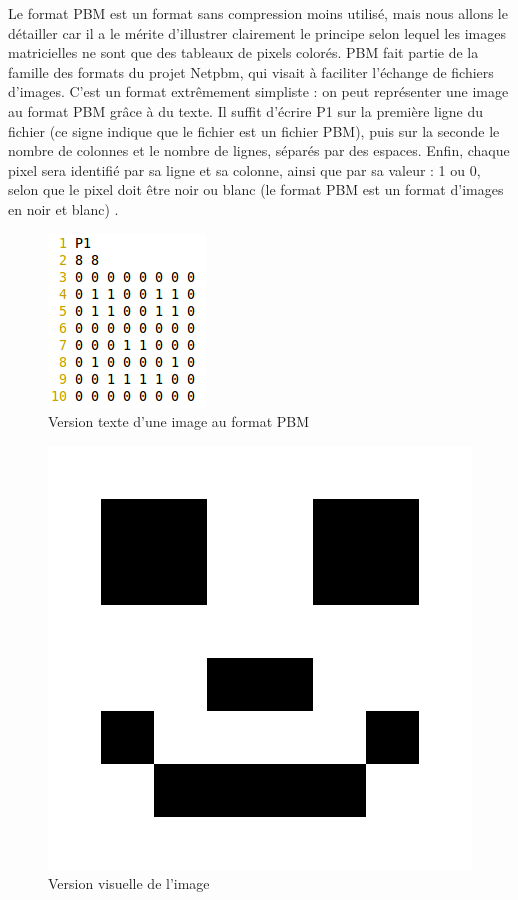 Le format PBM est un format sans compression moins utilisé, mais nous allons le détailler car il a le mérite d'illustrer clairement le
principe selon lequel les images matricielles ne sont que des tableaux
de pixels colorés. PBM fait partie de la famille des formats du projet Netpbm,
qui visait à faciliter l'échange de fichiers d'images. C'est un format
extrêmement simpliste : on peut représenter une image au format PBM grâce
à du texte. Il suffit d'écrire P1 sur la première ligne du fichier
(ce signe indique que le fichier est un fichier PBM), puis sur la
seconde le nombre de colonnes et le nombre de lignes, séparés par
des espaces. Enfin, chaque pixel sera identifié par sa ligne et sa
colonne, ainsi que par sa valeur : 1 ou 0, selon que le pixel doit
être noir ou blanc (le format PBM est un format d'images en noir et
blanc) \cite{Pbm06}.

\begin{figure}[H]
  \centering
    \includegraphics{figures/image1}
  \caption{Version texte d'une image au format PBM}
  \label{fig:pbmtext}
\end{figure}

\begin{figure}[H]
  \centering
    \includegraphics[scale=0.2]{figures/image2}
  \caption{Version visuelle de l'image}
  \label{fig:pbmpic}
\end{figure}

